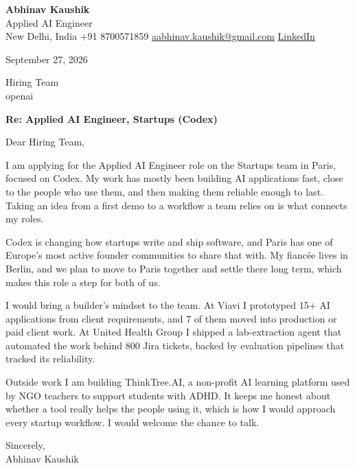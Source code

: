 \documentclass[11pt,a4paper]{article}
\begin{document}
{\Large\bfseries Abhinav Kaushik}\\
Applied AI Engineer\\
New Delhi, India \textbar{} +91 8700571859 \textbar{} \href{mailto:aabhinav.kaushik@gmail.com}{aabhinav.kaushik@gmail.com} \textbar{} \href{https://www.linkedin.com/in/abhinav-kaushik10/}{LinkedIn}  

September 27, 2026

Hiring Team\\
openai

\textbf{Re: Applied AI Engineer, Startups (Codex)}

Dear Hiring Team,

I am applying for the Applied AI Engineer role on the Startups team in Paris, focused on Codex. My work has mostly been building AI applications fast, close to the people who use them, and then making them reliable enough to last. Taking an idea from a first demo to a workflow a team relies on is what connects my roles.

Codex is changing how startups write and ship software, and Paris has one of Europe's most active founder communities to share that with. My fiancée lives in Berlin, and we plan to move to Paris together and settle there long term, which makes this role a step for both of us.

I would bring a builder's mindset to the team. At Viavi I prototyped 15+ AI applications from client requirements, and 7 of them moved into production or paid client work. At United Health Group I shipped a lab-extraction agent that automated the work behind 800 Jira tickets, backed by evaluation pipelines that tracked its reliability.

Outside work I am building ThinkTree.AI, a non-profit AI learning platform used by NGO teachers to support students with ADHD. It keeps me honest about whether a tool really helps the people using it, which is how I would approach every startup workflow. I would welcome the chance to talk.

Sincerely,\\[4pt]
Abhinav Kaushik
\end{document}
